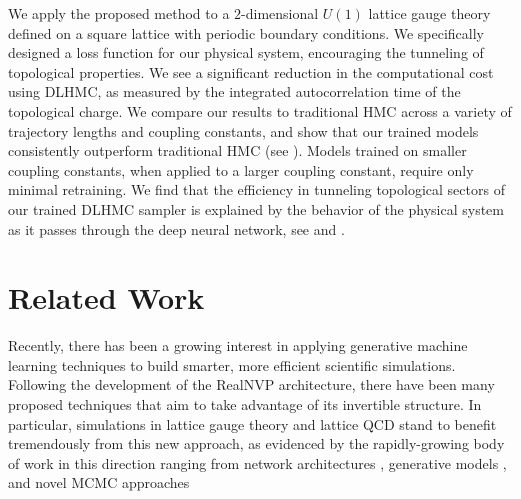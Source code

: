 \documentclass{article} %
\begin{document}
We apply the proposed method to a \(2\)-dimensional \(U(1)\) lattice gauge theory defined on a square lattice with
periodic boundary conditions.
%
We specifically designed a loss function for our physical system, encouraging the tunneling of topological properties.
%
We see a significant reduction in the computational cost using DLHMC, as measured by the integrated autocorrelation time
of the topological charge.
%
We compare our results to traditional HMC across a variety of trajectory lengths and coupling constants, and show that
our trained models consistently outperform traditional HMC (see ).
%
Models trained on smaller coupling constants, when applied to a larger coupling constant, require only minimal
retraining.
%
We find that the efficiency in tunneling topological sectors of our trained DLHMC sampler
is explained by the behavior of the physical system as it passes through the deep neural network,
see  and .
%
\section{\label{sec:relatedwork}Related Work}
Recently, there has been a growing interest in applying generative machine learning techniques to build smarter, more
efficient scientific simulations.
%
Following the development of the RealNVP \citep{dinhRealNVP} architecture, there have been many proposed techniques that
aim to take advantage of its invertible structure.
%
In particular, simulations in lattice gauge theory and lattice QCD stand to benefit tremendously from this new approach,
as evidenced by the rapidly-growing body of work in this direction ranging from network architectures
\citep{dinhRealNVP,favoni2020lattice,toth2020hamiltonian}, %
generative models
\citep{albergo2019flow,albergo2021introduction,medvidovic2020generative,boyda2020sampling,kanwar2020equivariant,wehenkel2020you,tomiya2021gauge},
and novel MCMC approaches
\citep{pasarica2010adaptively,tanaka2017towards,hoffman2019neutra,neklyudov2020orbital,neklyudov2020involutive,rezende2020normalizing,li2020neural}
\end{document}
